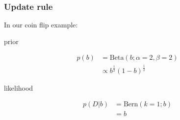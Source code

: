 \documentclass[t, aspectratio=169]{beamer}
\begin{document}
\begin{frame}
  \frametitle{Update rule}
  In our coin flip example:\\
  \begin{minipage}{0.1\paperwidth}
    prior
  \end{minipage}
  \hspace{0.05\paperwidth}
  \begin{minipage}{0.3\paperwidth}
    \begin{align*}
      p(b) &= \mathrm{Beta}(b; \alpha=2, \beta=2) \\
           &\propto b^{\frac{1}{2}} (1-b)^{\frac{1}{2}}
    \end{align*}
  \end{minipage}
  \begin{minipage}[t][][b]{0.3\paperwidth}
    \begin{adjustbox}{width=0.7\textwidth}
    \end{adjustbox}
  \end{minipage}

  \begin{minipage}{0.1\paperwidth}
    likelihood
  \end{minipage}
  \begin{minipage}{0.3\paperwidth}
    \begin{align*}
      p(D|b) &= \mathrm{Bern}(k=1; b) \\
             &= b
    \end{align*}
  \end{minipage}
  \begin{minipage}{0.3\paperwidth}
  \begin{adjustbox}{width=0.7\textwidth}
    \end{adjustbox}
  \end{minipage}
  

\end{frame}
\end{document}
